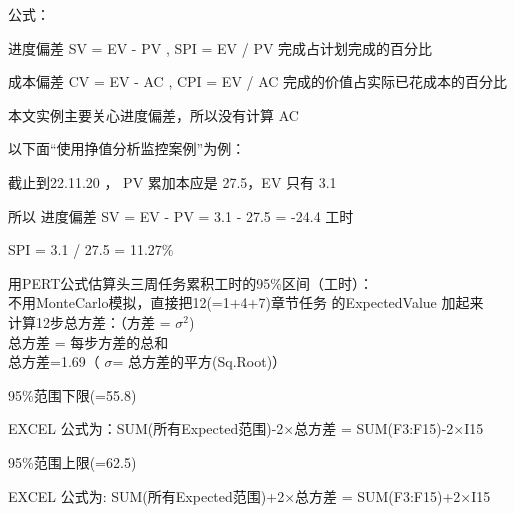 公式：

\begin{description}
\tightlist
\item[]
进度偏差 SV = EV - PV , SPI = EV / PV 完成占计划完成的百分比

成本偏差 CV = EV - AC , CPI = EV / AC 完成的价值占实际已花成本的百分比
\end{description}

本文实例主要关心进度偏差，所以没有计算 AC

以下面“使用挣值分析监控案例”为例：

截止到22.11.20 ， PV 累加本应是 27.5，EV 只有 3.1

\begin{description}
\tightlist
\item[]
所以 进度偏差 SV = EV - PV = 3.1 - 27.5 = -24.4 工时
\end{description}

SPI = 3.1 / 27.5 = 11.27\%

用PERT公式估算头三周任务累积工时的95\%区间（工时）：\\
不用MonteCarlo模拟，直接把12(=1+4+7)章节任务 的ExpectedValue 加起来\\
计算12步总方差：（方差 = \(\sigma^2\))\\
总方差 = 每步方差的总和\\
总方差=1.69（ \(\sigma\)= 总方差的平方(Sq.Root)）

\begin{description}
\item[]
\end{description}

\begin{description}
\tightlist
\item[]
95\%范围下限(=55.8)

\begin{description}
\tightlist
\item[]
EXCEL 公式为：SUM(所有Expected范围)-2×总方差 = SUM(F3:F15)-2×I15
\end{description}

95\%范围上限(=62.5)

\begin{description}
\tightlist
\item[]
EXCEL 公式为: SUM(所有Expected范围)+2×总方差 = SUM(F3:F15)+2×I15
\end{description}
\end{description}

